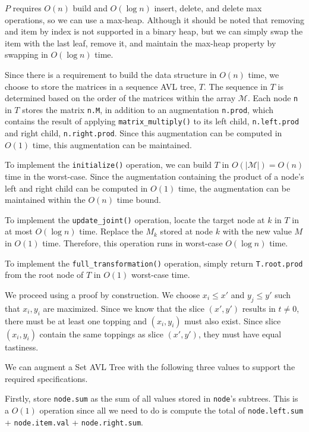 \documentclass[12pt,twoside]{article}
\begin{document}
\begin{problems}
$P$ requires $O(n)$ build and $O(\log n)$ insert, delete, and delete max operations, so we can use a max-heap. Although it should be noted that removing and item by index is not supported in a binary heap, but we can simply swap the item with the last leaf, remove it, and maintain the max-heap property by swapping in $O(\log n)$ time.

\newpage
\problem  %
Since there is a requirement to build the data structure in $O(n)$ time, we choose to store the matrices in a sequence AVL tree, $T$. The sequence in $T$ is determined based on the order of the matrices within the array $\mathcal{M}$. Each node \verb|n| in $T$ stores the matrix \verb|n.M|, in addition to an augmentation \verb|n.prod|, which contains the result of applying \verb|matrix_multiply()| to its left child, \verb|n.left.prod| and right child, \verb|n.right.prod|. Since this augmentation can be computed in $O(1)$ time, this augmentation can be maintained.

To implement the \verb|initialize()| operation, we can build $T$ in $O(|\mathcal{M}|)=O(n)$ time in the worst-case. Since the augmentation containing the product of a node's left and right child can be computed in $O(1)$ time, the augmentation can be maintained within the $O(n)$ time bound.

To implement the \verb|update_joint()| operation, locate the target node at $k$ in $T$ in at most $O(\log n)$ time. Replace the $M_k$ stored at node $k$ with the new value $M$ in $O(1)$ time. Therefore, this operation runs in worst-case $O(\log n)$ time. 

To implement the \verb|full_transformation()| operation, simply return \verb|T.root.prod| from the root node of $T$ in $O(1)$ worst-case time.

\newpage
\problem  %
\begin{problemparts}
\problempart %
We proceed using a proof by construction. We choose $x_i \leq x'$ and $y_j \leq y'$ such that $x_i,y_i$ are maximized. Since we know that the slice $(x',y')$ results in $t \neq 0$, there must be at least one topping and $(x_i, y_i)$ must also exist. Since slice $(x_i, y_i)$ contain the same toppings as slice $(x',y')$, they must have equal tastiness.

\problempart %
We can augment a Set AVL Tree with the following three values to support the required specifications. 

Firstly, store \verb|node.sum| as the sum of all values stored in \verb|node|'s subtrees. This is a $O(1)$ operation since all we need to do is compute the total of \verb|node.left.sum| + \verb|node.item.val| + \verb|node.right.sum|.


\end{problemparts}
\end{problems}
\end{document}
